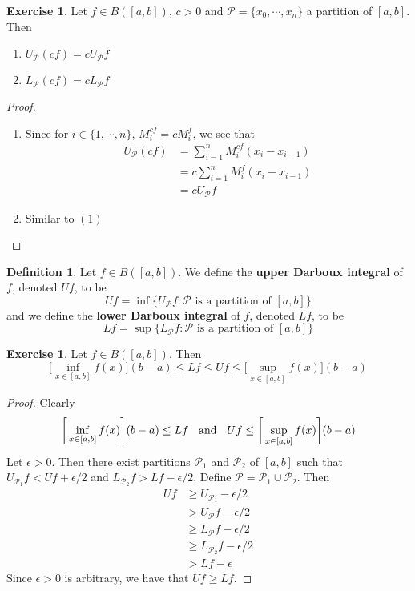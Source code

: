 \documentclass{book}
\theoremstyle{definition}
\newtheorem{defn}[definition]{Definition}
\newtheorem{ex}[definition]{Exercise}
\newcommand{\ep}{\epsilon}
\newcommand{\MP}{\mathcal{P}}
\newcommand{\lex}[1]{\label{ex:#1}}
\newcommand{\ld}[1]{\label{defn:#1}}
\DeclareMathOperator*{\0}{\mbf{0}}
\DeclareMathOperator*{\1}{\mbf{1}}
\begin{document}
	\begin{ex} \lex{00000} 
		Let $f \in B([a,b])$, $c >0$ and $\MP = \{x_0, \cdots, x_n\}$ a partition of $[a,b]$. Then 
		\begin{enumerate}
			\item $U_\MP (cf) = c U_\MP f$ 
			\item $L_\MP (cf) = c L_\MP f $
		\end{enumerate}
	\end{ex}

	\begin{proof}\
		\begin{enumerate}
			\item Since for $i \in \{1, \cdots, n\}$, $M^{cf}_i = cM^f_i$, we see that  
			\begin{align*}
				U_\MP (cf) 
				&= \sum_{i=1}^n M^{cf}_i (x_i - x_{i-1}) \\
				&= c \sum_{i=1}^n M^f_i (x_i - x_{i-1}) \\
				&= c U_\MP f
			\end{align*}
			\item Similar to $(1)$
		\end{enumerate}
	\end{proof}
	
	\begin{defn} \ld{00000} 
		Let $f \in B([a,b])$. We define the \textbf{upper Darboux integral} of $f$, denoted $U f$, to be $$Uf = \inf \{U_\MP f: \MP \text{ is a partition of } [a,b]\}$$
		and we define the \textbf{lower Darboux integral} of $f$, denoted $L f$, to be $$Lf = \sup \{L_\MP f: \MP \text{ is a partition of } [a,b]\}$$ 
	\end{defn}

	\begin{ex} \lex{00000} 
		Let $f \in B([a,b])$. Then $$ \bigg[\inf_{x \in [a,b]} f(x) \bigg] (b-a) \leq Lf \leq Uf \leq \bigg[\sup_{x \in [a,b]} f(x) \bigg] (b-a)$$
	\end{ex}

	\begin{proof}
		Clearly $$\bigg[\inf_{x \in [a,b]} f(x) \bigg] (b-a) \leq Lf \hspace{.2cm } \text{ and } \hspace{.2cm } Uf \leq \bigg[\sup_{x \in [a,b]} f(x) \bigg] (b-a)$$ 
		Let $\ep >0$. Then there exist partitions $\MP_1$ and $\MP_2$ of $[a,b]$ such that $U_{\MP_1} f < U f + \ep/2$ and $L_{\MP_2} f > Lf - \ep/2 $. Define $\MP = \MP_1 \cup \MP_2$. Then 
		\begin{align*}
			Uf 
			& \geq U_{\MP_1}  - \ep/2 \\
			&> U_\MP f - \ep/2 \\
			&\geq L_\MP f -\ep/2 \\
			&\geq L_{\MP_2} f -\ep/2 \\
			&> L f - \ep
		\end{align*} 
		Since $\ep >0$ is arbitrary, we have that $Uf \geq Lf$.
	\end{proof}
\end{document}
